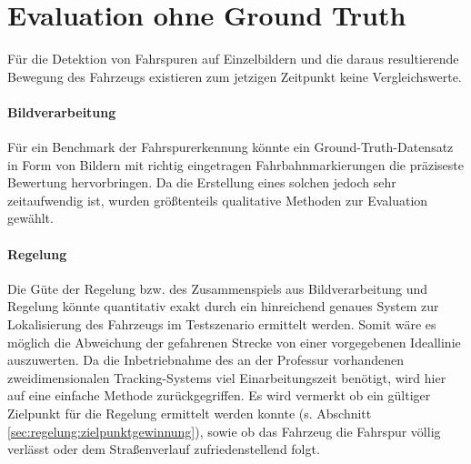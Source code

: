   
\section{Evaluation ohne Ground Truth \dcsecondauthorshort}
\label{ssec:evaluation:messungen:ohnegt}
Für die Detektion von Fahrspuren auf Einzelbildern und die daraus resultierende Bewegung des Fahrzeugs existieren zum jetzigen Zeitpunkt keine Vergleichswerte. 

\paragraph{Bildverarbeitung} 
Für ein Benchmark der Fahrspurerkennung könnte ein Ground-Truth-Datensatz in Form von Bildern mit richtig eingetragen Fahrbahnmarkierungen die präziseste Bewertung hervorbringen. Da die Erstellung eines solchen jedoch sehr zeitaufwendig ist, wurden größtenteils qualitative Methoden zur Evaluation gewählt.



\paragraph{Regelung} 
Die Güte der Regelung bzw. des Zusammenspiels aus Bildverarbeitung und Regelung könnte quantitativ exakt durch ein hinreichend genaues System zur Lokalisierung des Fahrzeugs im Testszenario ermittelt werden. Somit wäre es möglich die Abweichung der gefahrenen Strecke von einer vorgegebenen Ideallinie auszuwerten. Da die Inbetriebnahme des an der Professur vorhandenen zweidimensionalen Tracking-Systems viel Einarbeitungszeit benötigt, wird hier auf eine einfache Methode zurückgegriffen. Es wird vermerkt ob ein gültiger Zielpunkt für die Regelung ermittelt werden konnte (s. Abschnitt \ref{sec:regelung:zielpunktgewinnung}), sowie ob das Fahrzeug die Fahrspur völlig verlässt oder dem Straßenverlauf zufriedenstellend folgt.

